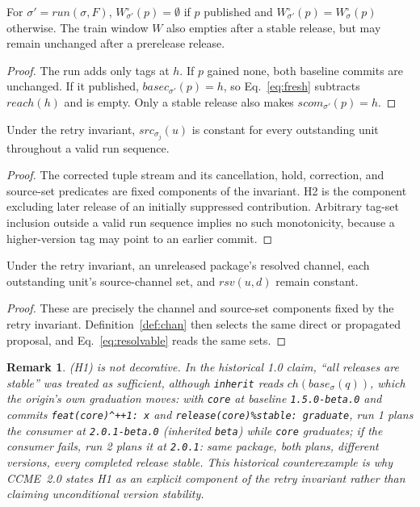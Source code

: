 \documentclass[sigconf,nonacm]{acmart}
\newcommand{\code}[1]{\texttt{#1}}
\newtheorem{remarknum}{Remark}
\begin{document}
\begin{lemma}
\label{lem:w}
For $\sigma' = \mathit{run}(\sigma,F)$, $W^\circ_{\sigma'}(p)=\emptyset$
if $p$ published and $W^\circ_{\sigma'}(p)=W^\circ_\sigma(p)$ otherwise.
The train window $W$ also empties after a stable release, but may remain
unchanged after a prerelease release.
\end{lemma}
\begin{proof}
The run adds only tags at $h$. If $p$ gained none, both baseline commits
are unchanged. If it published, $\mathit{basec}_{\sigma'}(p)=h$, so
Eq.~\ref{eq:fresh} subtracts $\mathit{reach}(h)$ and is empty. Only a
stable release also makes $\mathit{scom}_{\sigma'}(p)=h$.
\end{proof}

\begin{lemma}
\label{lem:s}
Under the retry invariant, $\mathit{src}_{\sigma_j}(u)$ is constant for
every outstanding unit throughout a valid run sequence.
\end{lemma}
\begin{proof}
The corrected tuple stream and its cancellation, hold, correction, and
source-set predicates are fixed components of the invariant. H2 is the
component excluding later release of an initially suppressed contribution.
Arbitrary tag-set inclusion outside a valid run sequence implies no such
monotonicity, because a higher-version tag may point to an earlier commit.
\end{proof}

\begin{lemma}
\label{lem:c}
Under the retry invariant, an unreleased package's resolved channel,
each outstanding unit's source-channel set, and
$\mathit{rsv}(u,d)$ remain constant.
\end{lemma}
\begin{proof}
These are precisely the channel and source-set components fixed by the
retry invariant. Definition~\ref{def:chan} then selects the same direct
or propagated proposal, and Eq.~\ref{eq:resolvable} reads the same sets.
\end{proof}

\begin{remarknum}
\label{rem:drift}
(H1) is not decorative. In the historical 1.0 claim, ``all releases are
stable'' was treated as sufficient, although \code{inherit} reads
$\mathit{ch}(\mathit{base}_\sigma(q))$, which the origin's own
graduation moves: with \code{core} at baseline \code{1.5.0-beta.0} and
commits \code{feat(core)\^{}++1:~x} and
\code{release(core)\%stable:~graduate}, run 1 plans the consumer at
\code{2.0.1-beta.0} (inherited \code{beta}) while \code{core}
graduates; if the consumer fails, run 2 plans it at \code{2.0.1}:
same package, both plans, different versions, every completed release
stable. This historical counterexample is why CCME~2.0 states H1 as an
explicit component of the retry invariant rather than claiming unconditional
version stability.
\end{remarknum}
\end{document}
